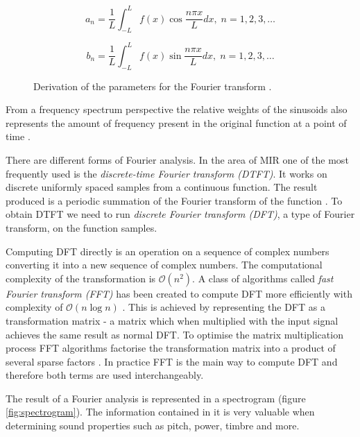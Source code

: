 \begin{figure}[H]
    \begin{equation}
        a_n = \frac{1}{L}\int_{-L}^{L}f(x)\cos\frac{n{\pi}x}{L}dx,\; n = 1,2,3,\dots
    \end{equation}

    \begin{equation}
        b_n = \frac{1}{L}\int_{-L}^{L}f(x)\sin\frac{n{\pi}x}{L}dx,\; n = 1,2,3,\dots
    \end{equation}
    \caption[Fourier series parameter derivation]{Derivation of the parameters for the Fourier transform \cite{fourierequations}.}
\end{figure}



From a frequency spectrum perspective the relative weights of the sinusoids also
represents the amount of frequency present in the original function at a point
of time \cite{wiki:fourier}. 

There are different forms of Fourier analysis. In the area of MIR one of the
most frequently used is the \textit{discrete-time Fourier transform (DTFT)}. It
works on discrete uniformly spaced samples from a continuous function. The
result produced is a periodic summation of the Fourier transform of the function
\cite{wiki:dtft}. To obtain DTFT we need to run \textit{discrete Fourier
transform (DFT)}, a type of Fourier transform, on the function samples. 

Computing DFT directly is an operation on a sequence of complex numbers
converting it into a new sequence of complex numbers. The computational
complexity of the transformation is $\mathcal{O}(n^2)$. A class of algorithms
called \textit{fast Fourier transform (FFT)} has been created to compute DFT
more efficiently with complexity of $\mathcal{O}(n\log{}n)$ \cite{fft}. This is
achieved by representing the DFT as a transformation matrix - a matrix which
when multiplied with the input signal achieves the same result as normal DFT. To
optimise the matrix multiplication process FFT algorithms factorise the
transformation matrix into a product of several sparse factors \cite{wiki:fft}.
In practice FFT is the main way to compute DFT and therefore both terms are used
interchangeably.

The result of a Fourier analysis is represented in a spectrogram (figure
\ref{fig:spectrogram}). The information contained in it is very valuable when
determining sound properties such as pitch, power, timbre and more.

